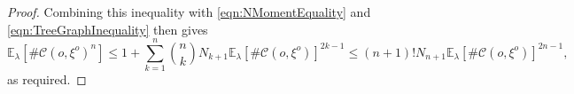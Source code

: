 \documentclass[10pt,a4paper]{amsart}
\newcommand{\C}{\mathscr {C}}
\newcommand{\ela}{\mathbb E_{\lambda}}
\newcommand{\orig}{o}
\begin{document}
\begin{proof}
Combining this inequality with \eqref{eqn:NMomentEquality} and \eqref{eqn:TreeGraphInequality} then gives
\begin{equation}
    \ela\left[\#\C\left(\orig,\xi^{\orig}\right)^n\right] \leq 1 + \sum^n_{k=1}\binom{n}{k}N_{k+1}\ela\left[\#\C\left(\orig,\xi^{\orig}\right)\right]^{2k-1} \leq \left(n+1\right)!N_{n+1}\ela\left[\#\C\left(\orig,\xi^{\orig}\right)\right]^{2n-1},
\end{equation}
as required.
\end{proof}
\end{document}
